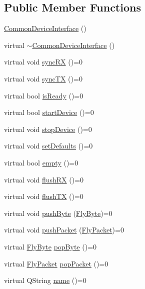 \subsection*{Public Member Functions}
\begin{DoxyCompactItemize}
\item 
\hyperlink{class_common_device_interface_ac9a72399dfc2b67e515719509ae7cf89}{Common\+Device\+Interface} ()
\item 
virtual \hyperlink{class_common_device_interface_aeb4b4a026ad42082cff5b7dbe41e29c8}{$\sim$\+Common\+Device\+Interface} ()
\item 
virtual void \hyperlink{class_common_device_interface_ac0166ca78cba5ae57a4803978af9e78c}{sync\+RX} ()=0
\item 
virtual void \hyperlink{class_common_device_interface_acae4ab2226a4f1388b2af355ac2e4f86}{sync\+TX} ()=0
\item 
virtual bool \hyperlink{class_common_device_interface_ae58207ead16a77fa94babe01f0a3ba40}{is\+Ready} ()=0
\item 
virtual bool \hyperlink{class_common_device_interface_aa25434f588f2b8e4daa77f57f595d161}{start\+Device} ()=0
\item 
virtual void \hyperlink{class_common_device_interface_a53aaf8eee7297f3ee272cc4f366506bf}{stop\+Device} ()=0
\item 
virtual void \hyperlink{class_common_device_interface_a542621a8b9e023531cae26447b2f8447}{set\+Defaults} ()=0
\item 
virtual bool \hyperlink{class_common_device_interface_ad670a54efd57ef65a659623f2a0b76e9}{empty} ()=0
\item 
virtual void \hyperlink{class_common_device_interface_a353c3bd7d63dfa9c3fa3d8bf1f392530}{flush\+RX} ()=0
\item 
virtual void \hyperlink{class_common_device_interface_a45edc68596f002f0765740ee14b39b77}{flush\+TX} ()=0
\item 
virtual void \hyperlink{class_common_device_interface_aadb344329a9235fbfa781611b4f769e1}{push\+Byte} (\hyperlink{conversions_8h_a1f006e31a957accfe6aa1bf6f401efce}{Fly\+Byte})=0
\item 
virtual void \hyperlink{class_common_device_interface_a682446d40e63ab7e6aa95dae7e0cd83b}{push\+Packet} (\hyperlink{class_fly_packet}{Fly\+Packet})=0
\item 
virtual \hyperlink{conversions_8h_a1f006e31a957accfe6aa1bf6f401efce}{Fly\+Byte} \hyperlink{class_common_device_interface_ab9f57b21f72ebfbf79c86f8d0e4f0654}{pop\+Byte} ()=0
\item 
virtual \hyperlink{class_fly_packet}{Fly\+Packet} \hyperlink{class_common_device_interface_a1b9c96bffa9af46a054e7ce0c341ea19}{pop\+Packet} ()=0
\item 
virtual Q\+String \hyperlink{class_common_device_interface_a3d80b22eafc88af3109b08491bef6e8a}{name} ()=0
\end{DoxyCompactItemize}


